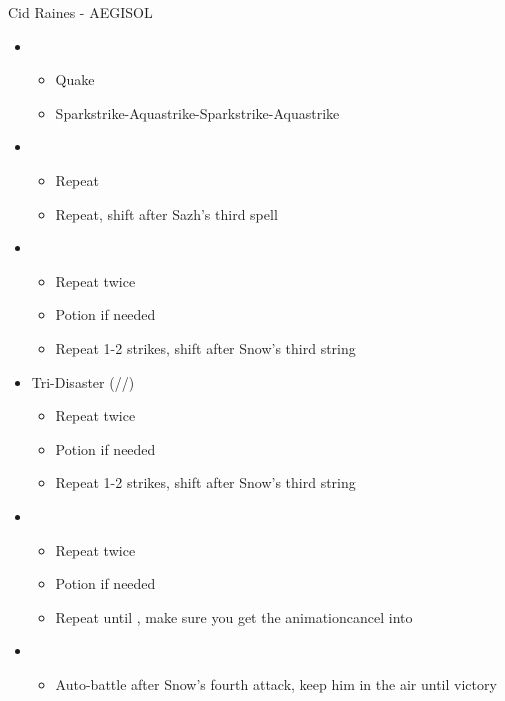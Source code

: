 	\begin{battle}[1:22]{Cid Raines - AEGISOL}
	\begin{itemize}
	\renewcommand{\fourth}{[4] Tri-Disaster (\rav/\rav/\rav)}
			\item \first
			      \begin{itemize}
				      \item Quake
				      \item Sparkstrike-Aquastrike-Sparkstrike-Aquastrike
			      \end{itemize}
			\item \third
			      \begin{itemize}
				      \item Repeat
				      \item Repeat, shift after Sazh's third spell
			      \end{itemize}
			\item \fifth
			      \begin{itemize}
				      \item Repeat twice
				      \item Potion if needed
                                                \item Repeat 1-2 strikes, shift after Snow's third string
			      \end{itemize}
			\item \fourth
			      \begin{itemize}
				      \item Repeat twice
				      \item Potion if needed
                                                \item Repeat 1-2 strikes, shift after Snow's third string
			      \end{itemize}
			\item \second
			      \begin{itemize}
				      \item Repeat twice
				      \item Potion if needed
			                \item Repeat until \stagger, make sure you get the animationcancel into
			      \end{itemize}
			\item \sixth
			      \begin{itemize}
				      \item Auto-battle after Snow's fourth attack, keep him in the air until victory
			      \end{itemize}
		\end{itemize}
		\end{battle}
